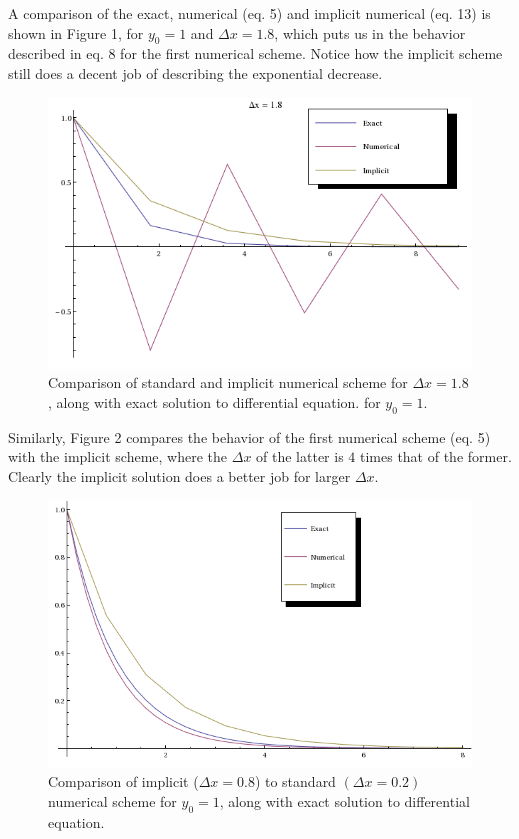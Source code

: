 \documentclass[12pt]{article}
\begin{document}
A comparison of the exact, numerical (eq. 5) and implicit numerical (eq. 13) is shown in Figure 1, for $y_0=1$ and $\Delta x=1.8$,  which puts us in the behavior described in eq. 8 for the first numerical scheme. Notice how the implicit scheme still does a decent job of describing the exponential decrease. 
\begin{figure}[ht]
\includegraphics[scale=0.65]{ode1.png} 
\caption{Comparison of standard and implicit numerical scheme for $\Delta x=1.8$, along with exact solution to differential equation. for $y_0=1$.  }
\end{figure}
Similarly, Figure 2 compares the behavior of the first numerical scheme (eq. 5) with the implicit scheme, where the $\Delta x$ of the latter is $4$ times that of the former. Clearly the implicit solution does a better job for larger $\Delta x$. 
\begin{figure}[ht]
\includegraphics[scale=0.65]{ode2.png} 
\caption{Comparison of implicit ($\Delta x=0.8$) to standard $(\Delta x=0.2)$ numerical scheme for $y_0=1$, along with exact solution to differential equation. }
\end{figure}
\end{document}
